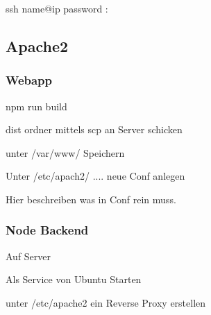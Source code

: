 \documentclass[a4paper,12pt]{article}
\begin{document}
ssh name@ip
password : 

\subsection{Apache2}

\subsubsection{Webapp}

npm run build 

dist ordner mittels scp an Server schicken 

unter /var/www/ Speichern 

Unter /etc/apach2/ .... neue Conf anlegen

Hier beschreiben was in Conf rein muss. 





\subsubsection{Node Backend}

Auf Server 

Als Service von Ubuntu Starten 

unter /etc/apache2  ein Reverse Proxy erstellen 
\end{document}
